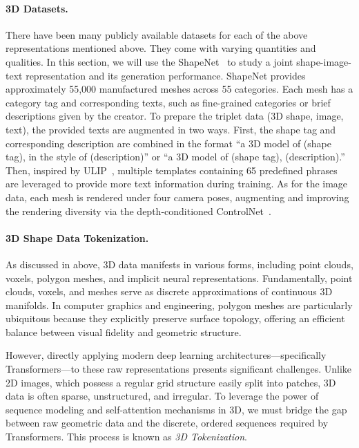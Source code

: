 \documentclass[../../book-main.tex]{subfiles}
\begin{document}
\paragraph{3D Datasets.}
There have been many publicly available datasets for each of the
above representations mentioned above. They come with varying
quantities and qualities. In this section, we will use the
ShapeNet~\cite{chang2015shapenet} to study a joint shape-image-text
representation and its generation performance. ShapeNet provides
approximately 55,000 manufactured meshes across 55 categories.
Each mesh has a category tag and corresponding texts, such as
fine-grained categories or brief descriptions given by the creator.
To prepare the triplet data (3D shape, image, text), the provided
texts are augmented in two ways.
First, the shape tag and corresponding description are combined in
the format ``a 3D model of (shape tag), in the style of
(description)'' or ``a 3D model of (shape tag), (description).''
Then, inspired by ULIP~\cite{10203465}, multiple templates containing
65 predefined phrases are leveraged to provide more text information
during training.
As for the image data, each mesh is rendered under four camera poses,
augmenting and improving the rendering diversity via the
depth-conditioned ControlNet~\cite{10377881}.

\paragraph{3D Shape Data Tokenization.}
\label{sec:3d_tokenization}
As discussed in above, 3D data
manifests in various forms, including point clouds, voxels, polygon
meshes, and implicit neural representations. Fundamentally, point
clouds, voxels, and meshes serve as discrete approximations of
continuous 3D manifolds. In computer graphics and engineering,
polygon meshes are particularly ubiquitous because they explicitly
preserve surface topology, offering an efficient balance between
visual fidelity and geometric structure.

However, directly applying modern deep learning
architectures—specifically Transformers—to these raw representations
presents significant challenges. Unlike 2D images, which possess a
regular grid structure easily split into patches, 3D data is often
sparse, unstructured, and irregular. To leverage the power of
sequence modeling and self-attention mechanisms in 3D, we must bridge
the gap between raw geometric data and the discrete, ordered
sequences required by Transformers. This process is known as
\textit{3D Tokenization}.
\end{document}
